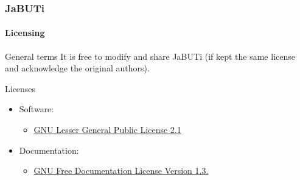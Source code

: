 \begin{frame}[parent={cmap:jabuti},hasnext=true,hasprev=true]
\frametitle{JaBUTi}
\framesubtitle{Licensing}
\label{concept:open-source}
\label{concept:gnu-lgpl}
\label{concept:gnu-fdl}

\begin{block:fact}{General terms}
It is free to modify and share JaBUTi (if kept the same license and
acknowledge the original authors).
\end{block:fact}

\begin{block:fact}{Licenses}
\begin{itemize}
	\item Software:
 	\begin{itemize}
		\item \href{http://www.gnu.org/licenses/lgpl-2.1.html}{GNU Lesser
		General Public License 2.1}
	\end{itemize}

 	\item Documentation:
	\begin{itemize}
		\item \href{http://www.gnu.org/licenses/fdl-1.3-standalone.html}{GNU Free
		Documentation License Version 1.3.}
	\end{itemize}
\end{itemize}
\end{block:fact}
\end{frame}

